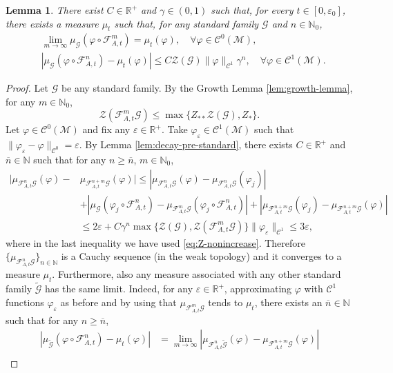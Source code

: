 \documentclass{amsart}
\numberwithin{equation}{section}
\newtheorem{lemma}[theorem]{Lemma}
\newcommand\ve{\varepsilon}
\newcommand\vf{\varphi}
\renewcommand{\ge}{\geqslant}
\renewcommand{\le}{\leqslant}
\newcommand\cC{{\mathcal C}}
\newcommand\cF{{\mathcal F}}
\newcommand\cG{{\mathcal G}}
\newcommand\cM{{\mathcal M}}
\newcommand\cZ{{\mathcal Z}}
\newcommand\bN{{\mathbb N}}
\newcommand\bR{{\mathbb R}}
\newcommand{\catt}{\cF_{A,t}}
\begin{document}
\begin{lemma}\label{lem:phys-measure}
There exist \(C \in \bR^+\) and \(\gamma \in (0,1)\) such that, for every \(t \in [0, \ve_0]\), there exists a measure \(\mu_t\) such that, for any standard family \(\cG\) and \(n \in \bN_0\),
\[
\begin{split}
&\lim_{m \to \infty} \mu_{\cG}\left(\vf \circ \catt^m\right) = \mu_t(\vf), \quad \forall \vf \in \cC^0(\cM),\\
&\left |\mu_{\cG}\left(\vf \circ \catt^n\right) - \mu_t(\vf)\right| \le C \cZ(\cG)\|\vf\|_{\cC^1}\gamma^n, \quad \forall \vf \in \cC^1(\cM).
\end{split}
\]
\end{lemma}
\begin{proof}
Let \(\cG\) be any standard family. By the Growth Lemma \ref{lem:growth-lemma}, for any \(m \in \bN_0\), 
\begin{equation}\label{eq:Z-nonincrease}
\cZ(\catt^m \cG) \le \max\{Z_{**}\cZ(\cG), Z_{*}\}.
\end{equation}
Let \(\vf \in \cC^0(\cM)\) and fix any \(\ve \in \bR^+\). Take \(\vf_{\ve} \in \cC^1(\cM)\) such that \(\|\vf_{\ve} - \vf\|_{\cC^0} = \ve\). By Lemma \ref{lem:decay-pre-standard}, there exists \(C \in \bR^+\) and \(\overline n \in \bN\) such that for any \(n \ge \overline n\), \(m \in \bN_0\),
\[
\begin{split}
\bigl| \mu_{\catt^n \cG}(\vf) -& \mu_{\catt^{n+m} \cG}(\vf)\bigr| \le \left| \mu_{\catt^n \cG}(\vf) - \mu_{\catt^{n} \cG}(\vf_j)\right| \\
&+ \left| \mu_{\cG}(\vf_j \circ \catt^n) - \mu_{\catt^{m} \cG}(\vf_j \circ \catt^n)\right| + \left| \mu_{\catt^{n+m} \cG}(\vf_j) - \mu_{\catt^{n+m} \cG}(\vf)\right|\\
&\le 2\ve + C \gamma^n \max \{\cZ(\cG), \cZ(\catt^m \cG)\}\|\vf_{\ve}\|_{\cC^1}  \le 3 \ve,
\end{split}
\]
where in the last inequality we have used \eqref{eq:Z-nonincrease}. Therefore \(\{\mu_{\catt^n \cG}\}_{n \in \bN}\) is a Cauchy sequence (in the weak topology) and it converges to a measure \(\mu_t\). Furthermore, also any measure associated with any other standard family \(\widetilde \cG\) has the same limit. Indeed, for any \(\ve \in \bR^+\), approximating \(\vf\) with \(\cC^1\) functions \(\vf_{\ve}\) as before and by using that \(\mu_{\catt^m\cG}\) tends to \(\mu_t\), there exists an \(\overline n \in \bN\) such that for any \(n \ge \overline n\),
\[
\begin{split}
|\mu_{\widetilde \cG}(\vf\circ \catt^n) - \mu_t(\vf)| & = \lim_{m \to \infty}|\mu_{\catt^n\widetilde \cG}(\vf) - \mu_{\catt^{n+m} \cG}(\vf)| \\

\end{split}\]
\end{proof}
\end{document}
